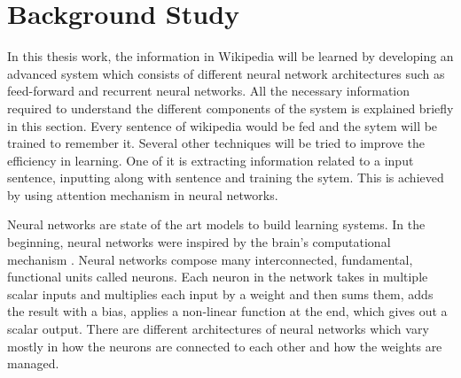 \documentclass[a4paper, 11pt]{article}
\begin{document}

  





\section{Background Study}

In this thesis work, the information in Wikipedia will be learned by developing an advanced system which consists of different neural network architectures such as feed-forward and recurrent neural networks. All the necessary information required to understand the different components of the system is explained briefly in this section. Every sentence of wikipedia would be fed and the sytem will be trained to remember it. Several other techniques will be tried to improve the efficiency in learning. One of it is extracting information related to a input sentence, inputting along with sentence and training the sytem. This is achieved by using attention mechanism in neural networks.

Neural networks are state of the art models to build learning systems. In the beginning, neural networks were inspired by the brain's computational mechanism \cite{McCulloch1943}. Neural networks compose many interconnected, fundamental, functional units called neurons. Each neuron in the network takes in multiple scalar inputs and multiplies each input by a weight and then sums them, adds the result with a bias, applies a non-linear function at the end, which gives out a scalar output. There are different architectures of neural networks which vary mostly in how the neurons are connected to each other and how the weights are managed. 
\end{document}
